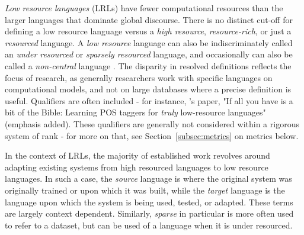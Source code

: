 \textit{Low resource languages} (LRLs) have fewer computational resources than the larger languages that dominate global discourse. There is no distinct cut-off for defining a low resource language versus a \textit{high resource}, \textit{resource-rich}, or just a \textit{resourced} language. A \textit{low resource} language can also be indiscriminately called an \textit{under resourced} or \textit{sparsely resourced} language, and occasionally can also be called a {\it non-central} language \citep{streiter2006implementing}. The disparity in resolved definitions reflects the focus of research, as generally researchers work with specific languages on computational models, and not on large databases where a precise definition is useful. Qualifiers are often included - for instance, \citet{agic2015if}'s paper, "If all you have is a bit of the Bible: Learning POS taggers for {\it truly} low-resource languages" (emphasis added). These qualifiers are generally not considered within a rigorous system of rank - for more on that, see Section~\ref{subsec:metrics} on metrics below.

In the context of LRLs, the majority of established work revolves around adapting existing systems from high resourced languages to low resource languages. In such a case, the \textit{source} language is where the original system was originally trained or upon which it was built, while the \textit{target} language is the language upon which the system is being used, tested, or adapted. These terms are largely context dependent. Similarly, \textit{sparse} in particular is more often used to refer to a dataset, but can be used of a language when it is under resourced.

